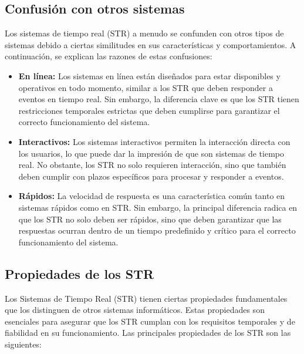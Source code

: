 \subsection{Confusión con otros sistemas}

Los sistemas de tiempo real (STR) a menudo se confunden con otros tipos de sistemas debido a ciertas similitudes en sus características y comportamientos. A continuación, se explican las razones de estas confusiones:

\begin{itemize}
    \item \textbf{En línea:} Los sistemas en línea están diseñados para estar disponibles y operativos en todo momento, similar a los STR que deben responder a eventos en tiempo real. Sin embargo, la diferencia clave es que los STR tienen restricciones temporales estrictas que deben cumplirse para garantizar el correcto funcionamiento del sistema.
    \item \textbf{Interactivos:} Los sistemas interactivos permiten la interacción directa con los usuarios, lo que puede dar la impresión de que son sistemas de tiempo real. No obstante, los STR no solo requieren interacción, sino que también deben cumplir con plazos específicos para procesar y responder a eventos.
    \item \textbf{Rápidos:} La velocidad de respuesta es una característica común tanto en sistemas rápidos como en STR. Sin embargo, la principal diferencia radica en que los STR no solo deben ser rápidos, sino que deben garantizar que las respuestas ocurran dentro de un tiempo predefinido y crítico para el correcto funcionamiento del sistema.
\end{itemize}

\subsection{Propiedades de los STR}

Los Sistemas de Tiempo Real (STR) tienen ciertas propiedades fundamentales que los distinguen de otros sistemas informáticos. Estas propiedades son esenciales para asegurar que los STR cumplan con los requisitos temporales y de fiabilidad en su funcionamiento. Las principales propiedades de los STR son las siguientes:

